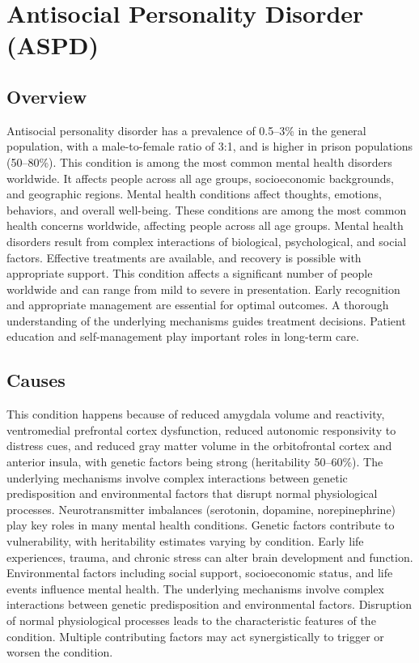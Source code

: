 \chapter{Antisocial Personality Disorder (ASPD)}
\label{sec:Antisocial Personality Disorder (ASPD)}

\section{Overview}
Antisocial personality disorder has a prevalence of 0.5--3\% in the general population, with a male-to-female ratio of 3:1, and is higher in prison populations (50--80\%). This condition is among the most common mental health disorders worldwide. It affects people across all age groups, socioeconomic backgrounds, and geographic regions. Mental health conditions affect thoughts, emotions, behaviors, and overall well-being. These conditions are among the most common health concerns worldwide, affecting people across all age groups. Mental health disorders result from complex interactions of biological, psychological, and social factors. Effective treatments are available, and recovery is possible with appropriate support. This condition affects a significant number of people worldwide and can range from mild to severe in presentation. Early recognition and appropriate management are essential for optimal outcomes. A thorough understanding of the underlying mechanisms guides treatment decisions. Patient education and self-management play important roles in long-term care.
\section{Causes}
This condition happens because of reduced amygdala volume and reactivity, ventromedial prefrontal cortex dysfunction, reduced autonomic responsivity to distress cues, and reduced gray matter volume in the orbitofrontal cortex and anterior insula, with genetic factors being strong (heritability 50--60\%). The underlying mechanisms involve complex interactions between genetic predisposition and environmental factors that disrupt normal physiological processes. Neurotransmitter imbalances (serotonin, dopamine, norepinephrine) play key roles in many mental health conditions. Genetic factors contribute to vulnerability, with heritability estimates varying by condition. Early life experiences, trauma, and chronic stress can alter brain development and function. Environmental factors including social support, socioeconomic status, and life events influence mental health. The underlying mechanisms involve complex interactions between genetic predisposition and environmental factors. Disruption of normal physiological processes leads to the characteristic features of the condition. Multiple contributing factors may act synergistically to trigger or worsen the condition.
